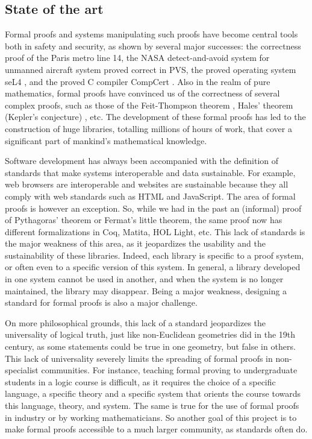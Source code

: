 \subsection{State of the art}

Formal proofs and systems manipulating such proofs have become central
tools both in safety and security, as shown by several major
successes: the correctness proof of the Paris metro line 14, the NASA
detect-and-avoid system for unmanned aircraft system proved correct in
PVS, the proved operating system seL4 \cite{Klein09}, and the proved C
compiler CompCert \cite{Leroy06}.  Also in the realm of pure
mathematics, formal proofs have convinced us of the correctness of
several complex proofs, such as those of the Feit-Thompson theorem
\cite{Gonthier13}, Hales' theorem (Kepler's conjecture)
\cite{Hales17}, etc.  The development of these formal proofs has led
to the construction of huge libraries, totalling millions of hours of
work, that cover a significant part of mankind's mathematical
knowledge.

Software development has always been accompanied with the definition
of standards that make systems interoperable and data sustainable. For
example, web browsers are interoperable and websites are sustainable
because they all comply with web standards such as HTML and
JavaScript. The area of formal proofs is however an exception. So,
while we had in the past an (informal) proof of Pythagoras' theorem or
Fermat's little theorem, the same proof now has different
formalizations in {\sc Coq}, {\sc Matita}, {\sc HOL Light}, etc. This
lack of standards is the major weakness of this area, as it
jeopardizes the usability and the sustainability of these
libraries. Indeed, each library is specific to a proof system, or
often even to a specific version of this system. In general, a library
developed in one system cannot be used in another, and when the system
is no longer maintained, the library may disappear. Being a major
weakness, designing a standard for formal proofs is also a major
challenge.

On more philosophical grounds, this lack of a standard jeopardizes the
universality of logical truth, just like non-Euclidean geometries did
in the 19th century, as some statements could be true in one
geometry, but false in others.  This lack of universality severely
limits the spreading of formal proofs in non-specialist
communities. For instance, teaching formal proving to undergraduate
students in a logic course is difficult, as it requires the choice of
a specific language, a specific theory and a specific system that
orients the course towards this language, theory, and system. The same
is true for the use of formal proofs in industry or by working
mathematicians. So another goal of this project is to make formal
proofs accessible to a much larger community, as standards often do.

